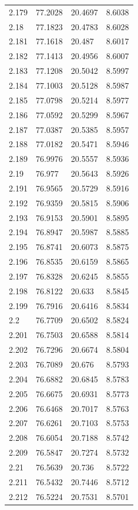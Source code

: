\begin{tabular}{llll}
2.179 & 77.2028 & 20.4697 & 8.6038 \\
2.18 & 77.1823 & 20.4783 & 8.6028 \\
2.181 & 77.1618 & 20.487 & 8.6017 \\
2.182 & 77.1413 & 20.4956 & 8.6007 \\
2.183 & 77.1208 & 20.5042 & 8.5997 \\
2.184 & 77.1003 & 20.5128 & 8.5987 \\
2.185 & 77.0798 & 20.5214 & 8.5977 \\
2.186 & 77.0592 & 20.5299 & 8.5967 \\
2.187 & 77.0387 & 20.5385 & 8.5957 \\
2.188 & 77.0182 & 20.5471 & 8.5946 \\
2.189 & 76.9976 & 20.5557 & 8.5936 \\
2.19 & 76.977 & 20.5643 & 8.5926 \\
2.191 & 76.9565 & 20.5729 & 8.5916 \\
2.192 & 76.9359 & 20.5815 & 8.5906 \\
2.193 & 76.9153 & 20.5901 & 8.5895 \\
2.194 & 76.8947 & 20.5987 & 8.5885 \\
2.195 & 76.8741 & 20.6073 & 8.5875 \\
2.196 & 76.8535 & 20.6159 & 8.5865 \\
2.197 & 76.8328 & 20.6245 & 8.5855 \\
2.198 & 76.8122 & 20.633 & 8.5845 \\
2.199 & 76.7916 & 20.6416 & 8.5834 \\
2.2 & 76.7709 & 20.6502 & 8.5824 \\
2.201 & 76.7503 & 20.6588 & 8.5814 \\
2.202 & 76.7296 & 20.6674 & 8.5804 \\
2.203 & 76.7089 & 20.676 & 8.5793 \\
2.204 & 76.6882 & 20.6845 & 8.5783 \\
2.205 & 76.6675 & 20.6931 & 8.5773 \\
2.206 & 76.6468 & 20.7017 & 8.5763 \\
2.207 & 76.6261 & 20.7103 & 8.5753 \\
2.208 & 76.6054 & 20.7188 & 8.5742 \\
2.209 & 76.5847 & 20.7274 & 8.5732 \\
2.21 & 76.5639 & 20.736 & 8.5722 \\
2.211 & 76.5432 & 20.7446 & 8.5712 \\
2.212 & 76.5224 & 20.7531 & 8.5701 \\

\end{tabular}

